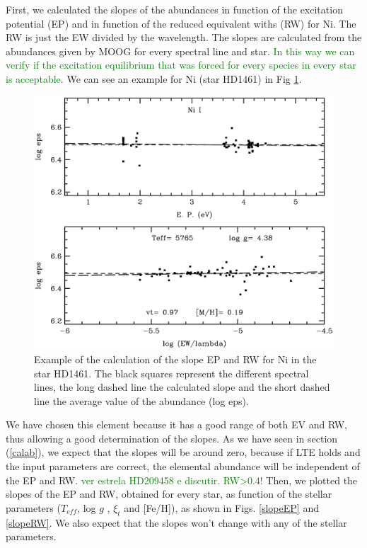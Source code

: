 \documentclass[dvips,12pt,a4paper]{report}
\begin{document}
{{First, we calculated the slopes of the abundances in function of the excitation potential (EP) and in function of the reduced equivalent withs (RW) for Ni. The RW is just the EW divided by the wavelength. The slopes are calculated from the abundances given by MOOG for every spectral line and star. \textcolor{green}{In this way we can verify if the excitation equilibrium that was forced for every species in every star is acceptable}. We can see an example for Ni (star HD1461) in Fig \ref{exslope}.
\begin{figure}[h]
\centering
\includegraphics[width= 10 cm]{pics/parte3/moogpicniq.eps}
\caption[Example of the calculation for Ni of the slope EP and RW]{Example of the calculation of the slope EP and RW for Ni in the star HD1461. The black squares represent the different spectral lines, the long dashed line the calculated slope and the short dashed line the average value of the abundance (log eps).}
\label{exslope}
\end{figure}
We have chosen this element because it has a good range of both EV and RW, thus allowing a good determination of the slopes. As we have seen in section (\ref{calab}), we expect that the slopes will be around zero, because if LTE holds and the input parameters are correct, the elemental abundance will be independent of the EP and RW. \textcolor{green}{ver estrela HD209458 e discutir. RW>0.4!} Then, we plotted the slopes of the EP and RW, obtained for every star, as function of the stellar parameters ($T_{eff}$, log $g$ , $\xi_t$ and [Fe/H]), as shown in Figs. \ref{slopeEP} and \ref{slopeRW}. We also expect that the slopes won't change with any of the stellar parameters.


}}
\end{document}
